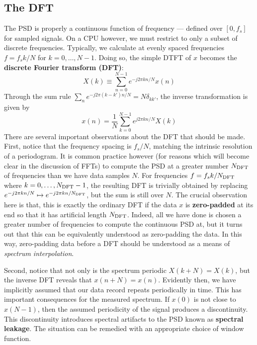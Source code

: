\documentclass[twocolumn]{gwclass}
\begin{document}
\subsection{The DFT}
The PSD is properly a continuous function of frequency --- defined over $[0,f_s]$ for sampled signals. On a CPU however, we must restrict to only a subset of discrete frequencies. Typically, we calculate at evenly spaced frequencies $f=f_s k/N$ for $k=0,\dots,N-1$. Doing so, the simple DTFT of $x$ becomes the \textbf{discrete Fourier transform (DFT)}:	
$$ X(k) \equiv \sum_{n=0}^{N-1}e^{-j2\pi kn/N}x(n) $$
Through the sum rule $\sum_n e^{-j2\pi (k-k')n/N}=N\delta_{kk'}$, the inverse transformation is given by
$$ x(n) = \frac{1}{N}\sum_{k=0}^{N-1}e^{j2\pi kn/N}X(k) $$
There are several important observations about the DFT that should be made. First, notice that the frequency spacing is $f_s/N$, matching the intrinsic resolution of a periodogram. It is common practice however (for reasons which will become clear in the discussion of FFTs) to compute the PSD at a greater number $N_{\text{\normalfont{DFT}}}$ of frequencies than we have data samples $N$. For frequencies $f=f_s k/N_{\text{\normalfont{DFT}}}$ where $k=0,\dots, N_{\text{\normalfont{DFT}}}-1$, the resulting DFT is trivially obtained by replacing $e^{-j2\pi k n/N}\mapsto e^{-j2\pi kn/N_{\text{\normalfont{DFT}}}}$, but the sum is still over $N$. The crucial observation here is that, this is exactly the ordinary DFT if the data $x$ is \textbf{zero-padded} at its end so that it has artificial length $N_{\text{\normalfont{DFT}}}$. Indeed, all we have done is chosen a greater number of frequencies to compute the continuous PSD at, but it turns out that this can be equivalently understood as zero-padding the data. In this way, zero-padding data before a DFT should be understood as a means of \emph{spectrum interpolation}.

Second, notice that not only is the spectrum periodic $X(k+N)=X(k)$, but the inverse DFT reveals that $x(n+N)=x(n)$. Evidently then, we have implicitly assumed that our data record repeats periodically in time. This has important consequences for the measured spectrum. If $x(0)$ is not close to $x(N-1)$, then the assumed periodicity of the signal produces a discontinuity. This discontinuity introduces spectral artifacts to the PSD known as \textbf{spectral leakage}. The situation can be remedied with an appropriate choice of window function.
\end{document}
